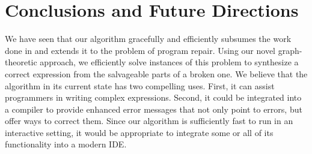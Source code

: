 \section{Conclusions and Future Directions}
\label{sec:concl}
We have seen that our algorithm gracefully and efficiently subsumes the work done in \cite{GveroETAL13CompleteCompletionTypesWeights, MandelinetALL2005Jungloid, PerelmanGBG12} and extends it to the problem of program repair. Using our novel graph-theoretic approach, we efficiently solve instances of this problem to synthesize a correct expression from the salvageable parts of a broken one. We believe that the algorithm in its current state has two compelling uses. First, it can assist programmers in writing complex expressions. Second, it could be integrated into a compiler to provide enhanced error messages that not only point to errors, but offer ways to correct them. Since our algorithm is sufficiently fast to run in an interactive setting, it would be appropriate to integrate some or all of its functionality into a modern IDE.
